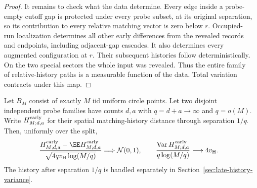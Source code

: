 \documentclass[11pt,letterpaper]{article}
\begin{document}
\begin{proof}
It remains to check what the data determine. Every edge inside
a probe-empty cutoff gap is protected under every probe subset,
at its original separation, so its contribution to every
relative matching vector is zero below $r$.
Occupied-run localization determines all other early differences
from the revealed records and endpoints, including adjacent-gap
cascades. It also determines every augmented configuration at
$r$. Their subsequent histories follow deterministically.
On the two special sectors the whole input was revealed.
Thus the entire family of relative-history paths is a
measurable function of the data. Total variation contracts
under this map.
\end{proof}

\begin{theorem}
\label{thm:finite-early-history-CLT}
Let $B_M$ consist of exactly $M$ iid uniform circle points.
Let two disjoint independent probe families have counts
$d,a$ with $q=d+a\to\infty$ and $q=o(M)$.
Write $H^{\rm early}_{M;d,a}$ for their spatial matching-history
distance through separation $1/q$. Then, uniformly over the split,
\begin{equation}\label{eq:finite-early-history-CLT}
 \frac{H^{\rm early}_{M;d,a}-\EE H^{\rm early}_{M;d,a}}
      {\sqrt{4qv_{\rm H}\log(M/q)}}
           \Longrightarrow\mathcal N(0,1),\qquad
 \frac{\operatorname{Var}H^{\rm early}_{M;d,a}}
                     {q\log(M/q)}\longrightarrow4v_{\rm H}.
\end{equation}
The history after separation $1/q$ is handled separately in
Section~\ref{sec:late-history-variance}.
\end{theorem}
\end{document}
